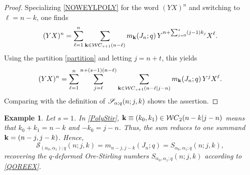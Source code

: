 \documentclass[10pt]{amsart}
\newtheorem{example}[theorem]{Example}%
\begin{document}
\begin{proof}
Specializing \eqref{NOWEYLPOLY} for the word $(YX)^n$ and switching to $\ell=n-k$, one finds
$$
(YX)^n=\sum_{\ell=1}^{n} \sum_{{\bf k} \in {\mathcal WC}_{s+1}(n-\ell)} m_{{\bf k}}(J_n;q) \, Y^{n+\sum_{j=0}^s (j-1)k_j} X^{\ell}.
$$
Using the partition \eqref{partition} and letting $j=n+t$, this yields
$$
(YX)^n=\sum_{\ell=1}^{n} \sum_{j=\ell}^{n+(s-1)(n-\ell)} \sum_{{\bf k} \in {\mathcal WC}_{s+1}(n-\ell|j-n)} m_{{\bf k}}(J_n;q) \, Y^{j} X^{\ell}.
$$
Comparing with the definition of ${\mathscr S}_{{\bf \alpha};q}(n;j,k)$ shows the assertion.  
\end{proof}
\begin{example}
Let $s=1$. In \eqref{PolyStir}, ${\bf k}\equiv (k_0,k_1) \in {\mathcal WC}_{2}(n-k|j-n)$ means that $k_0+k_1=n-k$ and $-k_0=j-n$. Thus, the sum reduces to one summand ${\bf k}=(n-j,j-k)$. Hence, 
$$
{\mathscr S}_{(\alpha_0,\alpha_1);q}(n;j,k)=m_{n-j,j-k}(J_n;q)=S_{\alpha_0,\alpha_1;q}(n;j,k),
$$ 
recovering the $q$-deformed Ore-Stirling numbers $S_{\alpha_0,\alpha_1;q}(n;j,k)$ according to \eqref{QOREEX}. 
\end{example}
\end{document}

